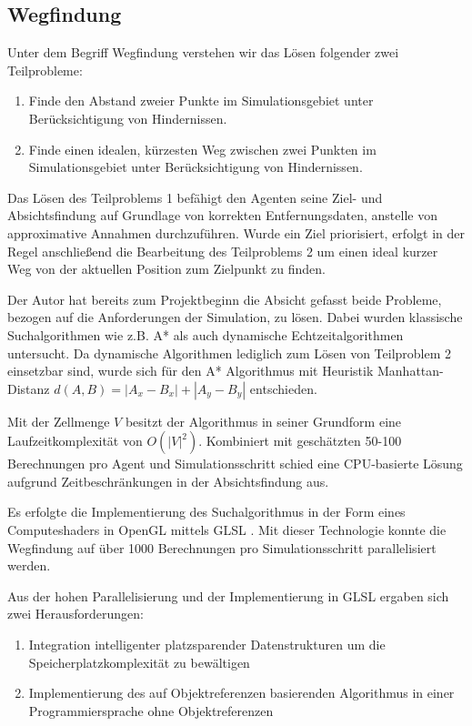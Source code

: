 \documentclass[runningheads]{llncs}
\begin{document}
\subsection{Wegfindung}\label{wegfindung}
Unter dem Begriff Wegfindung verstehen wir das Lösen folgender zwei Teilprobleme:
\begin{enumerate}
\item Finde den Abstand zweier Punkte im Simulationsgebiet unter Berücksichtigung von Hindernissen.
\item Finde einen idealen, kürzesten Weg zwischen zwei Punkten im Simulationsgebiet unter Berücksichtigung von Hindernissen.
\end{enumerate}
Das Lösen des Teilproblems 1 befähigt den Agenten seine Ziel- und Absichtsfindung auf Grundlage von korrekten Entfernungsdaten, anstelle von approximative Annahmen durchzuführen.
Wurde ein Ziel priorisiert, erfolgt in der Regel anschließend die Bearbeitung des Teilproblems 2 um einen ideal kurzer Weg von der aktuellen Position zum Zielpunkt zu finden.

Der Autor hat bereits zum Projektbeginn die Absicht gefasst beide Probleme, bezogen auf die Anforderungen der Simulation, zu lösen. Dabei wurden klassische Suchalgorithmen wie z.B. A* \cite{Hart1968} als auch dynamische Echtzeitalgorithmen \cite[182-191]{Weiss2000} untersucht. Da dynamische Algorithmen lediglich zum Lösen von Teilproblem 2 einsetzbar sind, wurde sich für den A* Algorithmus mit Heuristik Manhattan-Distanz $d(A, B) = | A_{x} - B_{x} | + | A_{y} - B_{y} |$ entschieden.

Mit der Zellmenge $V$ besitzt der Algorithmus in seiner Grundform eine Laufzeitkomplexität von $O(|V|^{2})$. Kombiniert mit geschätzten 50-100 Berechnungen pro Agent und Simulationsschritt schied eine CPU-basierte Lösung aufgrund Zeitbeschränkungen in der Absichtsfindung aus.

Es erfolgte die Implementierung des Suchalgorithmus in der Form eines Computeshaders in OpenGL mittels GLSL \cite{GLSL}. Mit dieser Technologie konnte die Wegfindung auf über 1000 Berechnungen pro Simulationsschritt parallelisiert werden.

Aus der hohen Parallelisierung und der Implementierung in GLSL ergaben sich zwei Herausforderungen:
\begin{enumerate}
\item Integration intelligenter platzsparender Datenstrukturen um die Speicherplatzkomplexität zu bewältigen
\item Implementierung des auf Objektreferenzen basierenden Algorithmus in einer Programmiersprache ohne Objektreferenzen
\end{enumerate}
\end{document}
